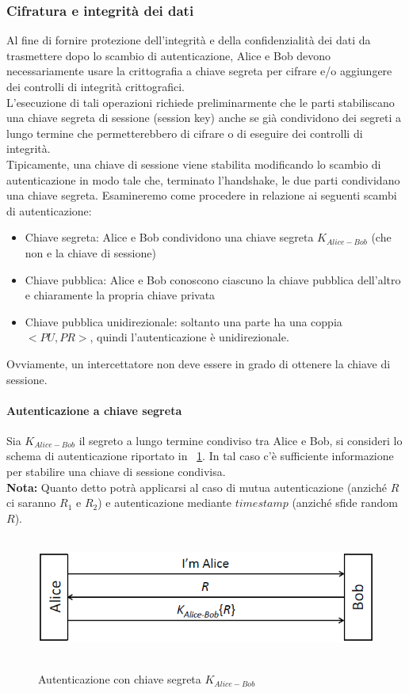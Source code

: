 \subsubsection{Cifratura e integrità dei dati}
Al fine di fornire protezione dell'integrità e della confidenzialità dei dati da trasmettere dopo lo scambio di autenticazione, Alice e Bob devono necessariamente usare la crittografia a chiave segreta per cifrare e/o aggiungere dei controlli di integrità crittografici.\\
L'esecuzione di tali operazioni richiede preliminarmente che le parti stabiliscano una chiave segreta di sessione (session key) anche se già condividono dei segreti a lungo termine che permetterebbero di cifrare o di eseguire dei controlli di integrità.\\
Tipicamente, una chiave di sessione viene stabilita modificando lo scambio di autenticazione in modo tale che, terminato l'handshake, le due parti condividano una chiave segreta. Esamineremo come procedere in relazione ai seguenti scambi di autenticazione:
\begin{itemize}
	\item Chiave segreta: Alice e Bob condividono una chiave segreta $K_{Alice-Bob}$ (che non e la chiave di sessione)
	\item Chiave pubblica: Alice e Bob conoscono ciascuno la chiave pubblica dell'altro e chiaramente la propria chiave privata
	\item Chiave pubblica unidirezionale: soltanto una parte ha una coppia $<PU,PR>$, quindi l'autenticazione è unidirezionale.
\end{itemize}
Ovviamente, un intercettatore non deve essere in grado di ottenere la chiave di sessione.
\paragraph{Autenticazione a chiave segreta}
Sia $K_{Alice-Bob}$ il segreto a lungo termine condiviso tra Alice e Bob, si consideri lo schema di autenticazione riportato in \figurename~\ref{fig:ImgS61bis}. In tal caso c'è sufficiente informazione per stabilire una chiave di sessione condivisa. \\
\textbf{Nota:} Quanto detto potrà applicarsi al caso di mutua autenticazione (anziché $R$ ci saranno $R_{1}$ e $R_{2}$) e autenticazione mediante $timestamp$ (anziché sfide random $R$).  \\
\begin{figure}[htbp]
	\centering%
	\subfigure%
	{\includegraphics[height=4cm, width=12cm, keepaspectratio]{Immagini/autenticazione/ImgS61bis.png}}
	\caption{Autenticazione con chiave segreta $K_{Alice-Bob}$}\label{fig:ImgS61bis} 	
\end{figure}

